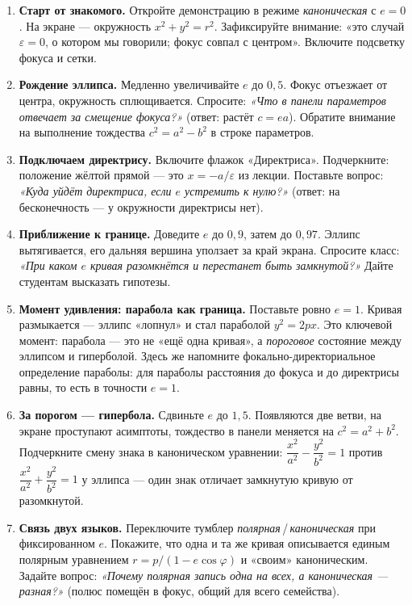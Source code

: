 \begin{enumerate}
  \item \textbf{Старт от знакомого.} Откройте демонстрацию в режиме
    \emph{каноническая} с $e = 0$. На экране — окружность $x^2 + y^2 = r^2$.
    Зафиксируйте внимание: «это случай $\varepsilon = 0$, о котором мы
    говорили; фокус совпал с центром». Включите подсветку фокуса и сетки.

  \item \textbf{Рождение эллипса.} Медленно увеличивайте $e$ до $0{,}5$.
    Фокус отъезжает от центра, окружность сплющивается. Спросите:
    \emph{«Что в панели параметров отвечает за смещение фокуса?»} (ответ:
    растёт $c = ea$). Обратите внимание на выполнение тождества
    $c^2 = a^2 - b^2$ в строке параметров.

  \item \textbf{Подключаем директрису.} Включите флажок «Директриса».
    Подчеркните: положение жёлтой прямой — это $x = -a/\varepsilon$ из
    лекции. Поставьте вопрос: \emph{«Куда уйдёт директриса, если $e$
    устремить к нулю?»} (ответ: на бесконечность — у окружности директрисы
    нет).

  \item \textbf{Приближение к границе.} Доведите $e$ до $0{,}9$, затем до
    $0{,}97$. Эллипс вытягивается, его дальняя вершина уползает за край
    экрана. Спросите класс: \emph{«При каком $e$ кривая разомкнётся и
    перестанет быть замкнутой?»} Дайте студентам высказать гипотезы.

  \item \textbf{Момент удивления: парабола как граница.} Поставьте ровно
    $e = 1$. Кривая размыкается — эллипс «лопнул» и стал параболой
    $y^2 = 2px$. Это ключевой момент: парабола — это не «ещё одна кривая», а
    \emph{пороговое} состояние между эллипсом и гиперболой. Здесь же
    напомните фокально-директориальное определение параболы:
    для параболы расстояния до фокуса и до директрисы равны, то есть в
    точности $e = 1$.

  \item \textbf{За порогом — гипербола.} Сдвиньте $e$ до $1{,}5$. Появляются
    две ветви, на экране проступают асимптоты, тождество в панели меняется
    на $c^2 = a^2 + b^2$. Подчеркните смену знака в каноническом уравнении:
    $\dfrac{x^2}{a^2} - \dfrac{y^2}{b^2} = 1$ против
    $\dfrac{x^2}{a^2} + \dfrac{y^2}{b^2} = 1$ у эллипса — один знак
    отличает замкнутую кривую от разомкнутой.

  \item \textbf{Связь двух языков.} Переключите тумблер
    \emph{полярная}\,/\,\emph{каноническая} при фиксированном $e$. Покажите,
    что одна и та же кривая описывается единым полярным уравнением
    $r = p/(1 - e\cos\varphi)$ и «своим» каноническим. Задайте вопрос:
    \emph{«Почему полярная запись одна на всех, а каноническая — разная?»}
    (полюс помещён в фокус, общий для всего семейства).


\end{enumerate}
